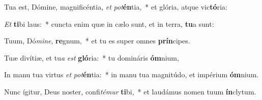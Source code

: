 \item Tua est, Dómine, magnificéntia, \textit{et} \textit{pot}\textbf{én}tia,~* et glória, atque vic\textbf{tó}ria:
\item \textit{Et} \textbf{ti}bi laus:~* cuncta enim quæ in cælo sunt, et in terra, \textbf{tu}a sunt:
\item Tuum, Dó\textit{mi}\textit{ne}, \textbf{re}gnum,~* et tu es super omnes \textbf{prín}cipes.
\item Tuæ divítiæ, et tu\textit{a} \textit{est} \textbf{gló}ria:~* tu domináris \textbf{óm}nium,
\item In manu tua virtus \textit{et} \textit{pot}\textbf{én}tia:~* in manu tua magnitúdo, et impérium \textbf{óm}nium.
\item Nunc ígitur, Deus noster, confi\textit{té}\textit{mur} \textbf{ti}bi,~* et laudámus nomen tuum \textbf{ín}clytum.

